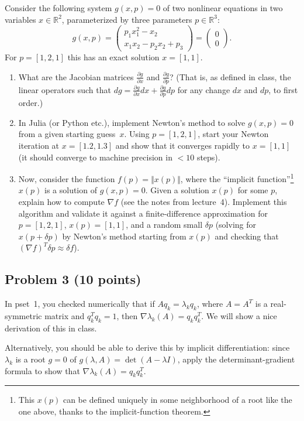 \documentclass[10pt,oneside]{article}
\begin{document}
Consider the following system $g(x,p)=0$ of two nonlinear equations
in two variables $x\in\mathbb{R}^{2}$, parameterized by three parameters
$p\in\mathbb{R}^{3}$:
\[
g(x,p)=\left(\begin{array}{c}
p_{1}x_{1}^{2}-x_{2}\\
x_{1}x_{2}-p_{2}x_{2}+p_{3}
\end{array}\right)=\left(\begin{array}{c}
0\\
0
\end{array}\right).
\]
For $p=[1,2,1]$ this has an exact solution $x=[1,1]$.
\begin{enumerate}
\item What are the Jacobian matrices $\frac{\partial g}{\partial x}$ and
$\frac{\partial g}{\partial p}$? (That is, as defined in class, the
linear operators such that $dg=\frac{\partial g}{\partial x}dx+\frac{\partial g}{\partial p}dp$
for any change $dx$ and $dp$, to first order.)
\item In Julia (or Python etc.), implement Newton's method to solve $g(x,p)=0$
from a given starting guess~$x$. Using $p=[1,2,1]$, start your
Newton iteration at $x=[1.2,1.3]$ and show that it converges rapidly
to $x=[1,1]$ (it should converge to machine precision in $<10$ steps).
\item Now, consider the function $f(p)=\Vert x(p)\Vert$, where the ``implicit
function''\footnote{This $x(p)$ can be defined uniquely in some neighborhood of a root
like the one above, thanks to the implicit-function theorem.} $x(p)$ is a solution of $g(x,p)=0$. Given a solution $x(p)$ for
some $p$, explain how to compute $\nabla f$ (see the notes from lecture~4). Implement this algorithm
and validate it against a finite-difference approximation for $p=[1,2,1]$,
$x(p)=[1,1]$, and a random small $\delta p$ (solving for $x(p+\delta p)$
by Newton's method starting from $x(p)$ and checking that $(\nabla f)^T \delta p \approx \delta f$).
\end{enumerate}

\subsection*{Problem 3 (10 points)}

In pset~1, you checked numerically that if $Aq_k = \lambda_k q_k$, where $A=A^T$ is a real-symmetric matrix and $q_k^T q_k=1$, then $\nabla \lambda_k(A) = q_k q_k^T$.   We will show a nice derivation of this in class.

Alternatively, you should be able to derive this by implicit differentiation: since $\lambda_k$ is a root $g=0$ of $g(\lambda,A) = \det(A - \lambda I)$, apply the determinant-gradient formula to show that $\nabla \lambda_k(A) = q_k q_k^T$.
\end{document}
